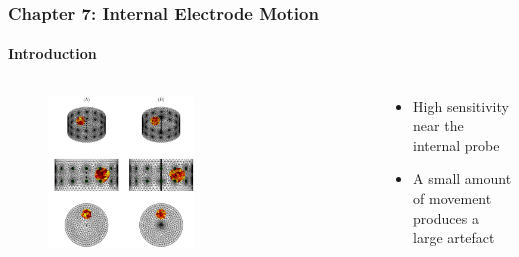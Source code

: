 \documentclass[10pt,    %
    english,            %
    xcolor=table,       %
    envcountsect,        %
    aspectratio=1610
]{beamer}
\begin{document}
\begin{frame}
	\frametitle{Chapter 7: Internal Electrode Motion}
	\framesubtitle{Introduction}
	\begin{columns}[c]
		\begin{column}{0.5\textwidth}
			\begin{figure}[H]
				\centering
				\includegraphics[width=0.52\textwidth,trim={18cm 0cm 0 1.4cm},clip]{probe_types.pdf}
			\end{figure}
		\end{column}
		\begin{column}{0.5\textwidth}
			\begin{itemize}
				\item High sensitivity near the internal probe
				\item A small amount of movement produces a large artefact
			\end{itemize}
		\end{column}
	\end{columns}%
\end{frame}
\end{document}
